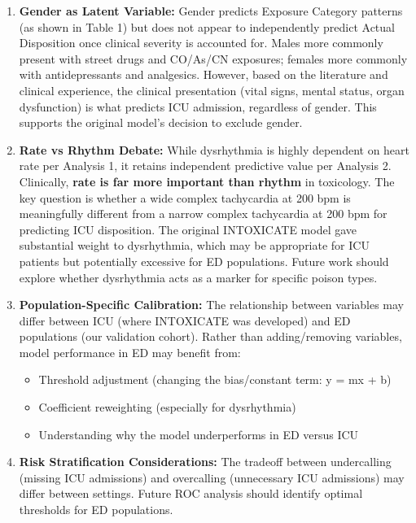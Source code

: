 \documentclass[
]{article}
\providecommand{\tightlist}{%
  \setlength{\itemsep}{0pt}\setlength{\parskip}{0pt}}
\begin{document}
\begin{enumerate}
\def\labelenumi{\arabic{enumi}.}
\item
  \textbf{Gender as Latent Variable:} Gender predicts Exposure Category patterns (as shown in Table 1) but does not appear to independently predict Actual Disposition once clinical severity is accounted for. Males more commonly present with street drugs and CO/As/CN exposures; females more commonly with antidepressants and analgesics. However, based on the literature and clinical experience, the clinical presentation (vital signs, mental status, organ dysfunction) is what predicts ICU admission, regardless of gender. This supports the original model's decision to exclude gender.
\item
  \textbf{Rate vs Rhythm Debate:} While dysrhythmia is highly dependent on heart rate per Analysis 1, it retains independent predictive value per Analysis 2. Clinically, \textbf{rate is far more important than rhythm} in toxicology. The key question is whether a wide complex tachycardia at 200 bpm is meaningfully different from a narrow complex tachycardia at 200 bpm for predicting ICU disposition. The original INTOXICATE model gave substantial weight to dysrhythmia, which may be appropriate for ICU patients but potentially excessive for ED populations. Future work should explore whether dysrhythmia acts as a marker for specific poison types.
\item
  \textbf{Population-Specific Calibration:} The relationship between variables may differ between ICU (where INTOXICATE was developed) and ED populations (our validation cohort). Rather than adding/removing variables, model performance in ED may benefit from:

  \begin{itemize}
  \tightlist
  \item
    Threshold adjustment (changing the bias/constant term: y = mx + b)
  \item
    Coefficient reweighting (especially for dysrhythmia)
  \item
    Understanding why the model underperforms in ED versus ICU
  \end{itemize}
\item
  \textbf{Risk Stratification Considerations:} The tradeoff between undercalling (missing ICU admissions) and overcalling (unnecessary ICU admissions) may differ between settings. Future ROC analysis should identify optimal thresholds for ED populations.
\end{enumerate}
\end{document}
